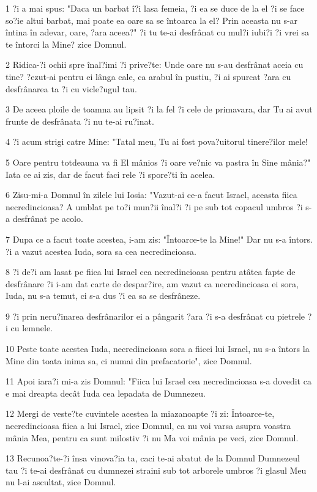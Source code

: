 \par 1 ?i a mai spus: "Daca un barbat î?i lasa femeia, ?i ea se duce de la el ?i se face so?ie altui barbat, mai poate ea oare sa se întoarca la el? Prin aceasta nu s-ar întina în adevar, oare, ?ara aceea?" ?i tu te-ai desfrânat cu mul?i iubi?i ?i vrei sa te întorci la Mine? zice Domnul.
\par 2 Ridica-?i ochii spre înal?imi ?i prive?te: Unde oare nu s-au desfrânat aceia cu tine? ?ezut-ai pentru ei lânga cale, ca arabul în pustiu, ?i ai spurcat ?ara cu desfrânarea ta ?i cu vicle?ugul tau.
\par 3 De aceea ploile de toamna au lipsit ?i la fel ?i cele de primavara, dar Tu ai avut frunte de desfrânata ?i nu te-ai ru?inat.
\par 4 ?i acum strigi catre Mine: "Tatal meu, Tu ai fost pova?uitorul tinere?ilor mele!
\par 5 Oare pentru totdeauna va fi El mânios ?i oare ve?nic va pastra în Sine mânia?" Iata ce ai zis, dar de facut faci rele ?i spore?ti în acelea.
\par 6 Zisu-mi-a Domnul în zilele lui Iosia: "Vazut-ai ce-a facut Israel, aceasta fiica necredincioasa? A umblat pe to?i mun?ii înal?i ?i pe sub tot copacul umbros ?i s-a desfrânat pe acolo.
\par 7 Dupa ce a facut toate acestea, i-am zis: "Întoarce-te la Mine!" Dar nu s-a întors. ?i a vazut acestea Iuda, sora sa cea necredincioasa.
\par 8 ?i de?i am lasat pe fiica lui Israel cea necredincioasa pentru atâtea fapte de desfrânare ?i i-am dat carte de despar?ire, am vazut ca necredincioasa ei sora, Iuda, nu s-a temut, ci s-a dus ?i ea sa se desfrâneze.
\par 9 ?i prin neru?inarea desfrânarilor ei a pângarit ?ara ?i s-a desfrânat cu pietrele ?i cu lemnele.
\par 10 Peste toate acestea Iuda, necredincioasa sora a fiicei lui Israel, nu s-a întors la Mine din toata inima sa, ci numai din prefacatorie", zice Domnul.
\par 11 Apoi iara?i mi-a zis Domnul: "Fiica lui Israel cea necredincioasa s-a dovedit ca e mai dreapta decât Iuda cea lepadata de Dumnezeu.
\par 12 Mergi de veste?te cuvintele acestea la miazanoapte ?i zi: Întoarce-te, necredincioasa fiica a lui Israel, zice Domnul, ca nu voi varsa asupra voastra mânia Mea, pentru ca sunt milostiv ?i nu Ma voi mânia pe veci, zice Domnul.
\par 13 Recunoa?te-?i însa vinova?ia ta, caci te-ai abatut de la Domnul Dumnezeul tau ?i te-ai desfrânat cu dumnezei straini sub tot arborele umbros ?i glasul Meu nu l-ai ascultat, zice Domnul.
